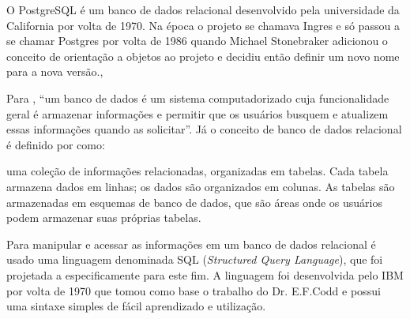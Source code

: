 \par O PostgreSQL é um banco de dados relacional desenvolvido pela universidade
da California por volta de 1970. Na época o projeto se chamava Ingres e só
passou a se chamar Postgres por volta de 1986 quando Michael Stonebraker adicionou
o conceito de orientação a objetos ao projeto e decidiu então definir um novo
nome para a nova versão.\cite{livro_postgres_doulgas},
\par Para  , ``um banco de dados é um
sistema computadorizado cuja funcionalidade geral é armazenar informações e
permitir que os usuários busquem e atualizem essas informações quando as
solicitar''. Já o conceito de banco de dados relacional é definido por
 como:
\begin{citacao}
uma coleção de informações relacionadas, organizadas em tabelas. Cada tabela
armazena dados em linhas; os dados são organizados em colunas. As tabelas são
armazenadas em esquemas de banco de dados, que são áreas  onde os usuários 
podem armazenar suas próprias tabelas.
\end{citacao}
 \par Para manipular e acessar as informações em um banco de dados relacional
 é usado uma linguagem denominada SQL (\textit{Structured Query Language}), que
 foi projetada a especificamente para este fim. A linguagem foi desenvolvida
 pelo IBM por volta de 1970 que tomou como base o trabalho do Dr. E.F.Codd
e possui uma sintaxe simples de fácil aprendizado e utilização.
\cite{oracle_database_sql}


